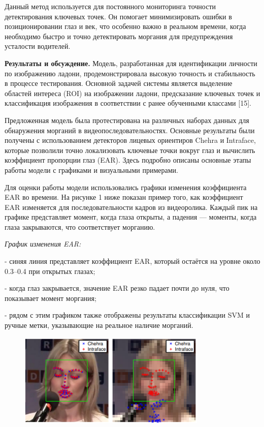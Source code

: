 Данный метод используется для постоянного мониторинга точности
детектирования ключевых точек. Он помогает минимизировать ошибки в
позиционировании глаз и век, что особенно важно в реальном времени,
когда необходимо быстро и точно детектировать моргания для
предупреждения усталости водителей.

{\bfseries Результаты и обсуждение.} Модель, разработанная для
идентификации личности по изображению ладони, продемонстрировала высокую
точность и стабильность в процессе тестирования. Основной задачей
системы является выделение областей интереса (ROI) на изображении
ладони, предсказание ключевых точек и классификация изображения в
соответствии с ранее обученными классами {[}15{]}.

Предложенная модель была протестирована на различных наборах данных для
обнаружения морганий в видеопоследовательностях. Основные результаты
были получены с использованием детекторов лицевых ориентиров Chehra и
Intraface, которые позволили точно локализовать ключевые точки вокруг
глаз и вычислить коэффициент пропорции глаз (EAR). Здесь подробно
описаны основные этапы работы модели с графиками и визуальными
примерами.

Для оценки работы модели использовались графики изменения коэффициента
EAR во времени. На рисунке 1 ниже показан пример того, как коэффициент
EAR изменяется для последовательности кадров из видеоролика. Каждый пик
на графике представляет момент, когда глаза открыты, а падения ---
моменты, когда глаза закрываются, что соответствует морганию.

\emph{График изменения EAR:}

- синяя линия представляет коэффициент EAR, который остаётся на уровне
около 0.3--0.4 при открытых глазах;

- когда глаз закрывается, значение EAR резко падает почти до нуля, что
показывает момент моргания;

- рядом с этим графиком также отображены результаты классификации SVM и
ручные метки, указывающие на реальное наличие морганий.

\begin{figure}[H]
	\centering
	\includegraphics[width=0.8\textwidth]{media/ict/image15}
	\caption*{}
\end{figure}


